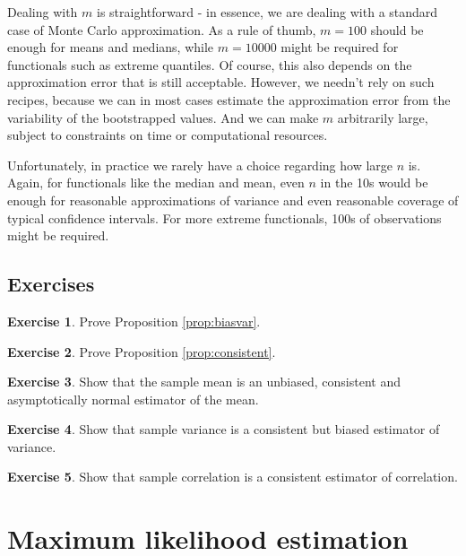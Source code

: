 \documentclass{book}
\theoremstyle{plain}%
\theoremstyle{definition}
\newtheorem{exercise}{Exercise}[chapter]
\begin{document}
Dealing with $m$ is straightforward - in essence, we are dealing with a standard case of Monte Carlo approximation. As a rule of thumb, $m = 100$ should be enough for means and medians, while $m = 10000$ might be required for functionals such as extreme quantiles. Of course, this also depends on the approximation error that is still acceptable. However, we needn't rely on such recipes, because we can in most cases estimate the approximation error from the variability of the bootstrapped values. And we can make $m$ arbitrarily large, subject to constraints on time or computational resources.

Unfortunately, in practice we rarely have a choice regarding how large $n$ is. Again, for functionals like the median and mean, even $n$ in the 10s would be enough for reasonable approximations of variance and even reasonable coverage of typical confidence intervals. For more extreme functionals, 100s of observations might be required.

\section*{Exercises}

\begin{exercise}
Prove Proposition \ref{prop:biasvar}.
\end{exercise}

\begin{exercise}
Prove Proposition \ref{prop:consistent}.
\end{exercise}

\begin{exercise}
Show that the sample mean is an unbiased, consistent and asymptotically normal estimator of the mean.
\end{exercise}

\begin{exercise}
Show that sample variance is a consistent but biased estimator of variance.
\end{exercise}

\begin{exercise}
Show that sample correlation is a consistent estimator of correlation.
\end{exercise}



\chapter{Maximum likelihood estimation}\label{ch:ml}
\end{document}
